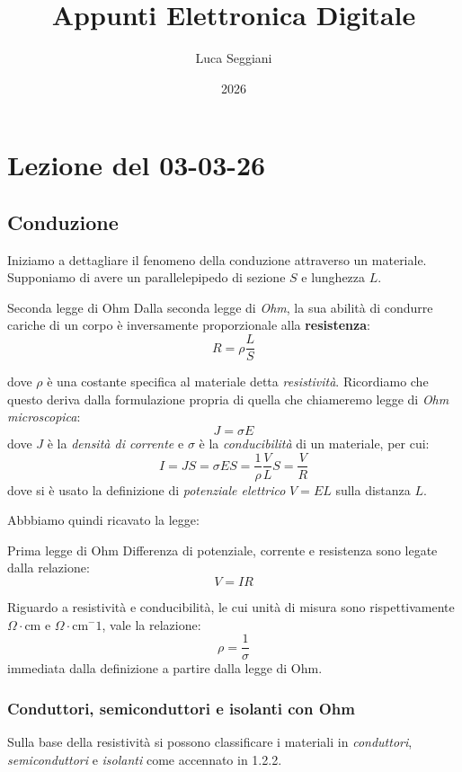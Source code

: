 \documentclass[a4paper,11pt]{article}
\title{Appunti Elettronica Digitale}
\author{Luca Seggiani}
\date{2026}
\begin{document}
\section{Lezione del 03-03-26}

\thispagestyle{empty}
\pagestyle{fancy}

\subsection{Conduzione}
Iniziamo a dettagliare il fenomeno della conduzione attraverso un materiale.
Supponiamo di avere un parallelepipedo di sezione $S$ e lunghezza $L$.

\begin{theorem}{Seconda legge di Ohm}
Dalla seconda legge di \textit{Ohm}, la sua abilità di condurre cariche di un corpo è inversamente proporzionale alla \textbf{resistenza}:
$$
R = \rho \frac{L}{S}
$$
\end{theorem}
dove $\rho$ è una costante specifica al materiale detta \textit{resistività}.
Ricordiamo che questo deriva dalla formulazione propria di quella che chiameremo legge di \textit{Ohm microscopica}:
$$
J = \sigma E
$$
dove $J$ è la \textit{densità di corrente} e $\sigma$ è la \textit{conducibilità} di un materiale, per cui:
$$
I = JS = \sigma E S = \frac{1}{\rho} \frac{V}{L} S = \frac{V}{R}
$$
dove si è usato la definizione di \textit{potenziale elettrico} $V = EL$ sulla distanza $L$.

Abbbiamo quindi ricavato la legge:
\begin{theorem}{Prima legge di Ohm}
Differenza di potenziale, corrente e resistenza sono legate dalla relazione:
$$
V = IR
$$
\end{theorem}

Riguardo a resistività e conducibilità, le cui unità di misura sono rispettivamente $\Omega \cdot \mathrm{cm}$ e $\Omega \cdot \mathrm{cm}^-1$, vale la relazione:
$$
\rho = \frac{1}{\sigma}
$$
immediata dalla definizione a partire dalla legge di Ohm.

\subsubsection{Conduttori, semiconduttori e isolanti con Ohm}
Sulla base della resistività si possono classificare i materiali in \textit{conduttori}, \textit{semiconduttori} e \textit{isolanti} come accennato in 1.2.2.
\end{document}
